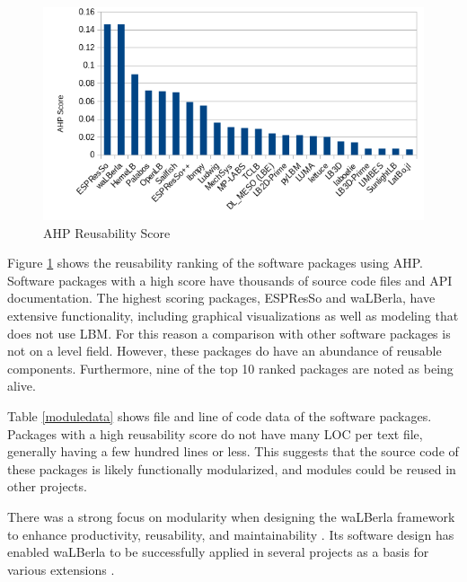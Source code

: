 \documentclass[12pt, notitlepage]{article}
\begin{document}
\begin{figure}[h!]
	\begin{center}
		\includegraphics[width=1.0\textwidth]{reusability_chart}
		\caption{AHP Reusability Score}
		\label{Fig_Reusabilty}
	\end{center}
\end{figure}

Figure \ref{Fig_Reusabilty} shows the reusability ranking of the software packages using AHP. Software packages with a high score have thousands of source code files and API documentation. The highest scoring packages, ESPResSo and waLBerla, have extensive functionality, including graphical visualizations as well as modeling that does not use LBM. For this reason a comparison with other software packages is not on a level field. However, these packages do have an abundance of reusable components. Furthermore, nine of the top 10 ranked packages are noted as being alive.

Table \ref{moduledata} shows file and line of code data of the software packages. Packages with a high reusability score do not have many LOC per text file, generally having a few hundred lines or less. This suggests that the source code of these packages is likely functionally modularized, and modules could be reused in other projects.  

There was a strong focus on modularity when designing the waLBerla framework to enhance productivity, reusability, and maintainability \citep{bauer2021walberla}. Its software design has enabled waLBerla to be successfully applied in several projects as a basis for various extensions \citep{bauer2021walberla}.\\ 
\end{document}
